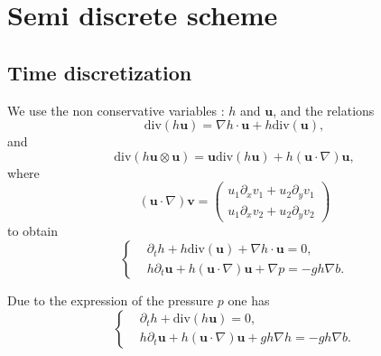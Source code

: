 \documentclass[a4paper, 11pt]{report}
\begin{document}
\section{Semi discrete scheme}
\subsection{Time discretization}
We use the non conservative variables : $h$ and $\boldsymbol{u}$, and the relations
\begin{equation*}
\text{div}\left(h\boldsymbol{u}\right)=\nabla h\cdot\boldsymbol{u}+h\text{div}\left(\boldsymbol{u}\right),
\end{equation*}
and
\begin{equation*}
\text{div}\left(h\boldsymbol{u}\otimes\boldsymbol{u}\right)=\boldsymbol{u}\text{div}\left(h\boldsymbol{u}\right)+h\left(\boldsymbol{u}\cdot\nabla\right)\boldsymbol{u},
\end{equation*}
where
\begin{equation*}
\left(\boldsymbol{u}\cdot\nabla\right)\boldsymbol{v}=\begin{pmatrix}u_1\partial_xv_1+u_2\partial_yv_1\\u_1\partial_xv_2+u_2\partial_yv_2\end{pmatrix}
\end{equation*}
to obtain 
\begin{equation*}
\left\{\begin{split}
&\partial_t h+h\text{div}(\boldsymbol{u})+\nabla h\cdot \boldsymbol{u}=0,\\
&h\partial_t \boldsymbol{u}+h\left(\boldsymbol{u}\cdot \nabla\right)\boldsymbol{u}+\nabla p=-gh\nabla b.
\end{split}\right.
\end{equation*}

Due to the expression of the pressure $p$ one has 
\begin{equation*}
\left\{\begin{split}
&\partial_t h+\text{div}\left(h\boldsymbol{u}\right)=0,\\
&h\partial_t \boldsymbol{u}+h\left(\boldsymbol{u}\cdot \nabla\right)\boldsymbol{u}+gh\nabla h=-gh\nabla b.
\end{split}\right.
\end{equation*}
\end{document}
